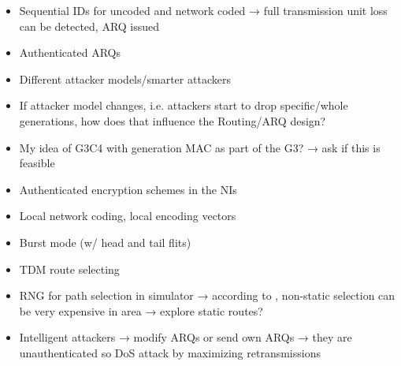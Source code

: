 \begin{itemize}
    \item Sequential IDs for uncoded and network coded → full transmission unit loss can be detected, ARQ issued
    \item Authenticated ARQs
    \item Different attacker models/smarter attackers
    \item If attacker model changes, i.e. attackers start to drop specific/whole generations,
        how does that influence the Routing/ARQ design?
    \item My idea of G3C4 with generation MAC as part of the G3? → ask if this is feasible
    \item Authenticated encryption schemes in the NIs
    \item Local network coding, local encoding vectors
    \item Burst mode (w/ head and tail flits)
    \item TDM route selecting
    \item RNG for path selection in simulator → according to \cite{stefan11enhancingnocs}, non-static selection can be very expensive in area →
        explore static routes?
    \item Intelligent attackers → modify ARQs or send own ARQs → they are unauthenticated so DoS attack by maximizing retransmissions
\end{itemize}
